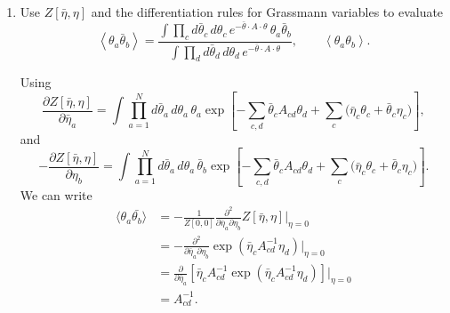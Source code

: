 \begin{enumerate}[label=\alph*)]
    \item Use $Z[\bar\eta,\eta]$ and the differentiation rules for Grassmann
    variables to evaluate
    \begin{equation}
        \left\langle\theta_a\bar\theta_b\right\rangle
        =\frac{
            \displaystyle
            \int\prod_c d\bar\theta_c\,d\theta_c\,
            e^{-\bar\theta\cdot A\cdot\theta}\,
            \theta_a\bar\theta_b
        }{
            \displaystyle
            \int\prod_d d\bar\theta_d\,d\theta_d\,
            e^{-\bar\theta\cdot A\cdot\theta}
        },
        \qquad
        \left\langle\theta_a\theta_b\right\rangle.
    \end{equation}
    \begin{solution}
        Using
        \begin{equation}
            \frac{\partial Z[\bar{\eta},\eta]}{\partial \bar{\eta}_a} = \int \prod_{a=1}^{N}d\bar\theta_a\,d\theta_a\,\theta_a
        \exp\!\left[
            -\sum_{c,d}\bar\theta_cA_{cd}\theta_d
            +\sum_c\bigl(\bar\eta_c\theta_c+\bar\theta_c\eta_c\bigr)
        \right],
        \end{equation}
        and
        \begin{equation}
            -\frac{\partial Z[\bar{\eta},\eta]}{\partial \eta_b} = \int \prod_{a=1}^{N}d\bar\theta_a\,d\theta_a\,\bar{\theta}_b
        \exp\!\left[
            -\sum_{c,d}\bar\theta_cA_{cd}\theta_d
            +\sum_c\bigl(\bar\eta_c\theta_c+\bar\theta_c\eta_c\bigr)
        \right].
        \end{equation}
        We can write
        \begin{equation}
        \begin{aligned}
            \langle\theta_a\bar{\theta_b}\rangle &= -\frac{1}{Z[0,0]}\frac{\partial^2}{\partial\bar\eta_a \partial\eta_b}Z[\bar{\eta}, \eta]\bigg|_{\eta=0}\\
            &=-\frac{\partial^2}{\partial\bar\eta_a \partial\eta_b}\exp(\bar{\eta}_cA_{cd}^{-1}\eta_d)\bigg|_{\eta=0}\\
            &=\frac{\partial}{\partial \bar \eta_a}\left[\bar \eta_c A_{cd}^{-1}\exp(\bar{\eta}_cA_{cd}^{-1}\eta_d)\right]\bigg|_{\eta=0}\\
            &= A_{cd}^{-1}.
        \end{aligned}
        \end{equation}
    \end{solution}


\end{enumerate}

